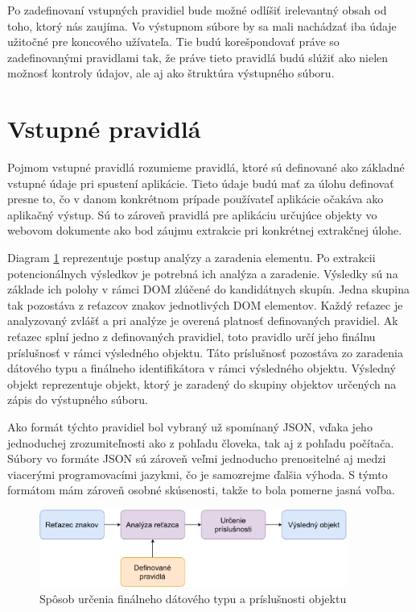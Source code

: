 Po zadefinovaní vstupných pravidiel bude možné odlíšiť irelevantný obsah od toho, ktorý nás zaujíma. Vo výstupnom súbore by sa mali nachádzať iba údaje užitočné pre koncového užívateľa. Tie budú korešpondovať práve so zadefinovanými pravidlami tak, že práve tieto pravidlá budú slúžiť ako nielen možnosť kontroly údajov, ale aj ako štruktúra výstupného súboru. 

\newpage
\section{Vstupné pravidlá}

Pojmom vstupné pravidlá rozumieme pravidlá, ktoré sú definované ako základné vstupné údaje pri spustení aplikácie. Tieto údaje budú mať za úlohu definovať presne to, čo v danom konkrétnom prípade používateľ aplikácie očakáva ako aplikačný výstup. Sú to zároveň pravidlá pre aplikáciu určujúce objekty vo webovom dokumente ako bod záujmu extrakcie pri konkrétnej extrakčnej úlohe. 

Diagram \ref{rules} reprezentuje postup analýzy a zaradenia elementu. Po extrakcii potencionálnych výsledkov je potrebná ich analýza a zaradenie. Výsledky sú na základe ich polohy v rámci DOM zlúčené do kandidátnych skupín. Jedna skupina tak pozostáva z reťazcov znakov jednotlivých DOM elementov. Každý reťazec je analyzovaný zvlášť a pri analýze je overená platnosť definovaných pravidiel. Ak reťazec splní jedno z definovaných pravidiel, toto pravidlo určí jeho finálnu príslušnosť v rámci výsledného objektu. Táto príslušnosť pozostáva zo zaradenia dátového typu a finálneho identifikátora v rámci výsledného objektu. Výsledný objekt reprezentuje objekt, ktorý je zaradený do skupiny objektov určených na zápis do výstupného súboru.

Ako formát týchto pravidiel bol vybraný už spomínaný JSON, vďaka jeho jednoduchej zrozumiteľnosti ako z pohľadu človeka, tak aj z pohľadu počítača. Súbory vo formáte JSON sú zároveň veľmi jednoducho prenositelné aj medzi viacerými programovacími jazykmi, čo je samozrejme ďalšia výhoda. S týmto formátom mám zároveň osobné skúsenosti, takže to bola pomerne jasná voľba.

\bigskip

\begin{figure}[hbt]
	\centering
	\includegraphics[width=0.9\textwidth]{obrazky-figures/rules.pdf}
	\caption{Spôsob určenia finálneho dátového typu a príslušnosti objektu}
	\label{rules}
\end{figure}

